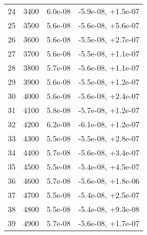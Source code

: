 \begin{table}
\begin{adjustbox}{width=1\textwidth/2}
\begin{tabular}{|c|c|c|c|}
\cline{1-4}
24 & 3400 & 6.0e-08 & -5.9e-08, +1.5e-07 \\
\cline{1-4}
25 & 3500 & 5.6e-08 & -5.6e-08, +5.6e-07 \\
\cline{1-4}
26 & 3600 & 5.6e-08 & -5.5e-08, +2.7e-07 \\
\cline{1-4}
27 & 3700 & 5.6e-08 & -5.5e-08, +1.1e-07 \\
\cline{1-4}
28 & 3800 & 5.7e-08 & -5.6e-08, +1.1e-07 \\
\cline{1-4}
29 & 3900 & 5.6e-08 & -5.5e-08, +1.2e-07 \\
\cline{1-4}
30 & 4000 & 5.6e-08 & -5.6e-08, +2.4e-07 \\
\cline{1-4}
31 & 4100 & 5.8e-08 & -5.7e-08, +1.2e-07 \\
\cline{1-4}
32 & 4200 & 6.2e-08 & -6.1e-08, +1.2e-07 \\
\cline{1-4}
33 & 4300 & 5.5e-08 & -5.5e-08, +2.8e-07 \\
\cline{1-4}
34 & 4400 & 5.7e-08 & -5.6e-08, +3.4e-07 \\
\cline{1-4}
35 & 4500 & 5.5e-08 & -5.4e-08, +4.5e-07 \\
\cline{1-4}
36 & 4600 & 5.7e-08 & -5.6e-08, +1.8e-06 \\
\cline{1-4}
37 & 4700 & 5.5e-08 & -5.4e-08, +2.5e-07 \\
\cline{1-4}
38 & 4800 & 5.5e-08 & -5.4e-08, +9.3e-08 \\
\cline{1-4}
39 & 4900 & 5.7e-08 & -5.6e-08, +1.7e-07 \\
\cline{1-4}
\end{tabular}
\end{adjustbox}
\end{table}

